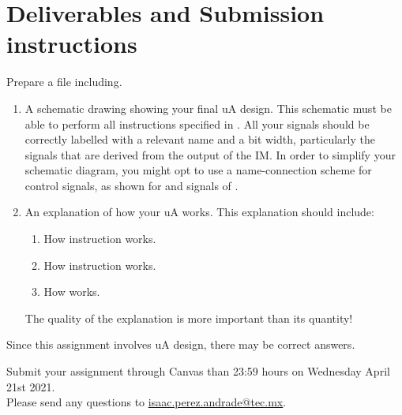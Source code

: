 \documentclass[number=03]{assignment}
\newcommand{\deadline}{23:59 hours on Wednesday April 21st 2021}
\begin{document}
%
\section{Deliverables and Submission instructions}\label{Sec:Deliverables}
Prepare a  file including.
\begin{enumerate}
\item {} A schematic drawing showing your final \ac{uA} design.
This schematic must be able to perform all instructions specified in .
All your signals should be correctly labelled with a relevant name and a bit width, particularly the signals that are derived from the output of the \ac{IM}.
In order to simplify your schematic diagram, you might opt to use a name-connection scheme for control signals, as shown for  and  signals of .

\item {} An explanation of how your \ac{uA} works.
This explanation should include:
\begin{enumerate}
  \item How  instruction works.
  \item How  instruction works.
  \item How  works.
\end{enumerate}
The quality of the explanation is more important than its quantity!
\end{enumerate} 

 Since this assignment involves \ac{uA} design, there may be  correct answers.

Submit your assignment through Canvas  than \deadline. 
\\
Please send any questions to \href{mailto:isaac.perez.andrade@tec.mx}{isaac.perez.andrade@tec.mx}.
\end{document}
